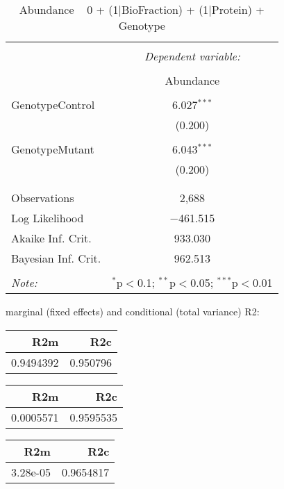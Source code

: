 \documentclass[11pt]{report}
\begin{document}
\begin{table}[!htbp] \centering 
  \caption{Abundance ~ 0 + (1|BioFraction) + (1|Protein) + Genotype} 
  \label{} 
\begin{tabular}{@{\extracolsep{5pt}}lc} 
\\[-1.8ex]\hline 
\hline \\[-1.8ex] 
 & \multicolumn{1}{c}{\textit{Dependent variable:}} \\ 
\cline{2-2} 
\\[-1.8ex] & Abundance \\ 
\hline \\[-1.8ex] 
 GenotypeControl & 6.027$^{***}$ \\ 
  & (0.200) \\ 
  & \\ 
 GenotypeMutant & 6.043$^{***}$ \\ 
  & (0.200) \\ 
  & \\ 
\hline \\[-1.8ex] 
Observations & 2,688 \\ 
Log Likelihood & $-$461.515 \\ 
Akaike Inf. Crit. & 933.030 \\ 
Bayesian Inf. Crit. & 962.513 \\ 
\hline 
\hline \\[-1.8ex] 
\textit{Note:}  & \multicolumn{1}{r}{$^{*}$p$<$0.1; $^{**}$p$<$0.05; $^{***}$p$<$0.01} \\ 
\end{tabular} 
\end{table} 
marginal (fixed effects) and conditional (total variance) R2:

\begin{tabular}{r|r}
\hline
R2m & R2c\\
\hline
0.9494392 & 0.950796\\
\hline
\end{tabular}

\begin{tabular}{r|r}
\hline
R2m & R2c\\
\hline
0.0005571 & 0.9595535\\
\hline
\end{tabular}

\begin{tabular}{r|r}
\hline
R2m & R2c\\
\hline
3.28e-05 & 0.9654817\\
\hline
\end{tabular}
\end{document}
